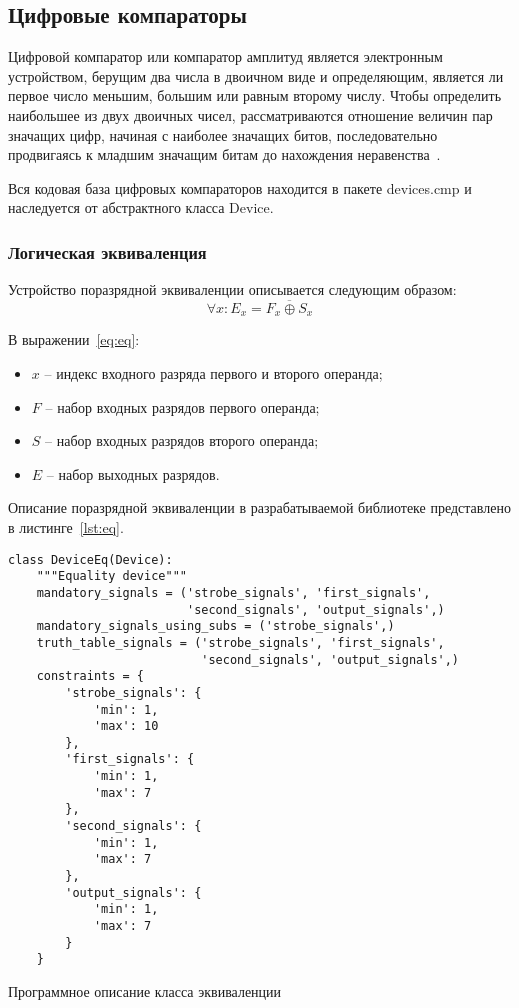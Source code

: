 \documentclass[document.tex]{subfiles}
\begin{document}
\clearpage

\subsection{Цифровые компараторы}
Цифровой компаратор или компаратор амплитуд является электронным устройством,
берущим два числа в двоичном виде и определяющим, является ли первое число
меньшим, большим или равным второму числу. Чтобы определить наибольшее из двух
двоичных чисел, рассматриваются отношение величин пар значащих цифр, начиная с
наиболее значащих битов, последовательно продвигаясь к младшим значащим битам до
нахождения неравенства~\cite{wikicmp}.

Вся кодовая база цифровых компараторов находится в пакете devices.cmp и
наследуется от абстрактного класса Device.

\subsubsection{Логическая эквиваленция}

Устройство поразрядной эквиваленции описывается следующим образом:
\begin{equation}
\label{eq:eq}
\forall x: E_x = \overline{F_x \oplus S_x} 
\end{equation}

В выражении~\ref{eq:eq}:
\begin{itemize}[noitemsep]
  \item $x$ -- индекс входного разряда первого и второго операнда;
  \item $F$ -- набор входных разрядов первого операнда;
  \item $S$ -- набор входных разрядов второго операнда;
  \item $E$ -- набор выходных разрядов.
\end{itemize}

\clearpage

Описание поразрядной эквиваленции в разрабатываемой библиотеке представлено в
листинге~\ref{lst:eq}.

\begin{listing}[ht]
\begin{verbatim}
class DeviceEq(Device):
    """Equality device"""
    mandatory_signals = ('strobe_signals', 'first_signals', 
                         'second_signals', 'output_signals',)
    mandatory_signals_using_subs = ('strobe_signals',)
    truth_table_signals = ('strobe_signals', 'first_signals', 
                           'second_signals', 'output_signals',)
    constraints = {
        'strobe_signals': {
            'min': 1,
            'max': 10
        },
        'first_signals': {
            'min': 1,
            'max': 7
        },
        'second_signals': {
            'min': 1,
            'max': 7
        },
        'output_signals': {
            'min': 1,
            'max': 7
        }
    }
\end{verbatim}
\caption{Программное описание класса эквиваленции}
\label{lst:eq}
\end{listing}
\end{document}
